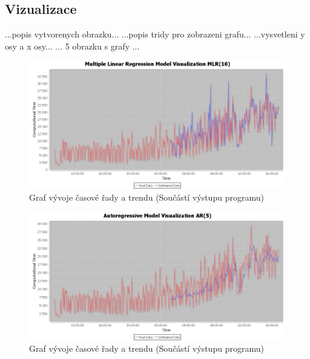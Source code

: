 \documentclass[a4paper,12pt,twoside]{scrreprt}
\begin{document}
\subsection{Vizualizace}

...popis vytvorenych obrazku...
\newline...popis tridy pro zobrazeni grafu...
\newline...vysvetleni y osy a x osy...
\newline ... 5 obrazku s grafy ...

\begin{figure}
  \centering
  \includegraphics[width=15cm]{pictures/grafy/MLR(10).jpeg}
  \caption{Graf vývoje časové řady a trendu \newline(Součástí výstupu programu)}
  \label{fig:regrese}
\end{figure}

\begin{figure}
  \centering
  \includegraphics[width=15cm]{pictures/grafy/AR(5).jpeg}
  \caption{Graf vývoje časové řady a trendu \newline(Součástí výstupu programu)}
  \label{fig:regrese}
\end{figure}
\end{document}
